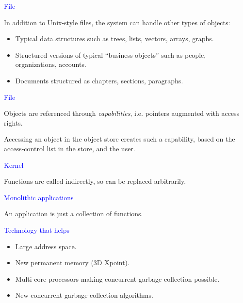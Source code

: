 \documentclass{slides}
\newcommand{\ti}[1]{\begin{center}\Large{\textcolor{blue}{#1}}\end{center}}
\begin{document}
\begin{slide}\ti{File}

In addition to Unix-style files, the system can handle other types of
objects:

\begin{itemize}
\item Typical data structures such as trees, lists, vectors, arrays,
  graphs.
\item Structured versions of typical ``business objects'' such as
  people, organizations, accounts.
\item Documents structured as chapters, sections, paragraphs.
\end{itemize}

\vfill\end{slide}
\begin{slide}\ti{File}

Objects are referenced through \emph{capabilities}, i.e. pointers
augmented with access rights.

Accessing an object in the object store creates such a capability,
based on the access-control list in the store, and the user.

\vfill\end{slide}
\begin{slide}\ti{Kernel}

Functions are called indirectly, so can be replaced arbitrarily.

\vfill\end{slide}
\begin{slide}\ti{Monolithic applications}

An application is just a collection of functions.

\vfill\end{slide}
\begin{slide}\ti{}

\vfill\end{slide}
\begin{slide}\ti{}

\vfill\end{slide}
\begin{slide}\ti{Technology that helps}

  \begin{itemize}
  \item Large address space.
  \item New permanent memory (3D Xpoint).
  \item Multi-core processors making concurrent garbage collection
    possible. 
  \item New concurrent garbage-collection algorithms.
  \end{itemize}

\vfill\end{slide}
\end{document}
